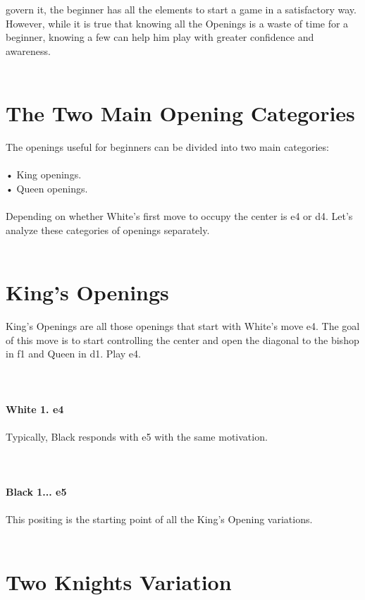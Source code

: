 \documentclass{article}
\begin{document}
govern it, the beginner has all the elements to start a game in a satisfactory way. However, while it is true that knowing all the Openings is a waste of time for a beginner, knowing a few can help him play with greater confidence and awareness.\\
\\
\section{ The Two Main Opening Categories}

The openings useful for beginners can be divided into two main categories:\\\\• King openings.\\• Queen openings.\\\\Depending on whether White's first move to occupy the center is e4 or d4. Let's analyze these categories of openings separately.\\
\\
\section{ King's Openings}

King's Openings are all those openings that start with White's move e4. The goal of this move is to start controlling the center and open the diagonal to the bishop in f1 and Queen in d1. Play e4.\\
\\

\\
\\
\textbf{White 1. e4}\\
\\
Typically, Black responds with e5 with the same motivation.\\
\\

\\
\\
\textbf{Black 1... e5}\\
\\
This positing is the starting point of all the King's Opening variations.\\
\\
\section{ Two Knights Variation}
\end{document}
